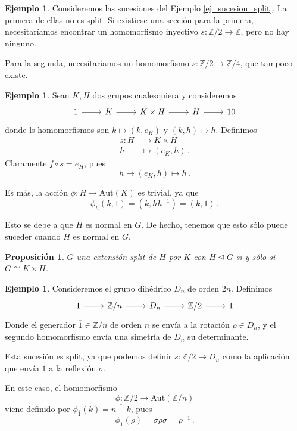 \documentclass[a4paper,11pt]{amsart}
\theoremstyle{plain}
\newtheorem{prop}[thm]{Proposición}
\theoremstyle{definition}
\newtheorem{ej}[thm]{Ejemplo}
\theoremstyle{remark}
\begin{document}
\begin{ej}
Consideremos las sucesiones del Ejemplo \ref{ej_sucesion_split}. La primera de ellas no es split. Si existiese una sección para la primera, necesitaríamos encontrar un homomorfismo inyectivo $s \colon \mathbb{Z}/2 \to \mathbb{Z}$, pero no hay ninguno.

Para la segunda, necesitaríamos un homomorfismo $s \colon \mathbb{Z}/2 \to \mathbb{Z}/4$, que tampoco existe. 
\end{ej}


\begin{ej}
Sean $K, H$ dos grupos cualesquiera y consideremos 
\begin{equation*}
    \begin{tikzcd}
    1 \arrow[r] & K \arrow[r] & K \times H \arrow[r] & H \arrow[r] & 10
    \end{tikzcd}
\end{equation*}
donde ls homomorfismos son $k \mapsto (k, e_H)$ y $(k, h) \mapsto h$. Definimos 
\begin{align*}
    s \colon H & \to K \times H \\
    h & \mapsto (e_K, h) \, .
\end{align*}
Claramente $f \circ s = e_H$, pues 
\[ h \mapsto (e_K, h)\mapsto h \, .\]

Es más, la acción $\phi \colon H \to \text{Aut}(K)$ es trivial, ya que 
\[ \phi_h(k, 1) = (k, hh^{-1}) = (k, 1) \, . \]

Esto se debe a que $H$ es normal en $G$. De hecho, tenemos que esto sólo puede suceder cuando $H$ es normal en $G$. 

\begin{prop}
$G$ una extensión split de $H$ por $K$ con $H \trianglelefteq G$ si y sólo si $G \cong K \times H$. 
\end{prop}
\end{ej}



\begin{ej}
Consideremos el grupo dihédrico $D_{n}$ de orden $2n$. Definimos 
\begin{equation*}
\begin{tikzcd}
    1 \arrow[r] & \mathbb{Z}/n \arrow[r] & D_n \arrow[r] & \mathbb{Z}/2 \arrow[r] & 1 
\end{tikzcd}
\end{equation*}
Donde el generador $\overline{1} \in \mathbb{Z}/n$ de orden $n$ se envía a la rotación $\rho \in D_n$, y el segundo homomorfismo envía una simetría de $D_n$  su determinante.

Esta sucesión es split, ya que podemos definir $s \colon \mathbb{Z}/2 \to D_n$ como la aplicación que envía $\overline{1}$ a la reflexión $\sigma$. 

En este caso, el homomorfismo 
\[ \phi \colon \mathbb{Z}/2 \to \text{Aut}(\mathbb{Z}/n)\]
viene definido por $\phi_{\overline{1}}(k)= \overline{n - k}$, pues 
\[\phi_1(\rho) = \sigma \rho \sigma = \rho^{-1} \, .\]

\end{ej}
\end{document}
